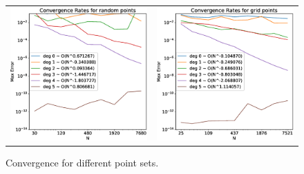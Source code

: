 \documentclass[12pt]{article}
\begin{document}
\begin{figure}[hp]
\begin{tabular}{cc}
			\includegraphics[width=\convFigSize\textwidth]{Convergence_random.eps} & \includegraphics[width=\convFigSize\textwidth]{Convergence_grid.eps} \\
		\end{tabular}
		\caption{Convergence for different point sets.}
		\label{convergence}
	\end{figure}
\end{document}
